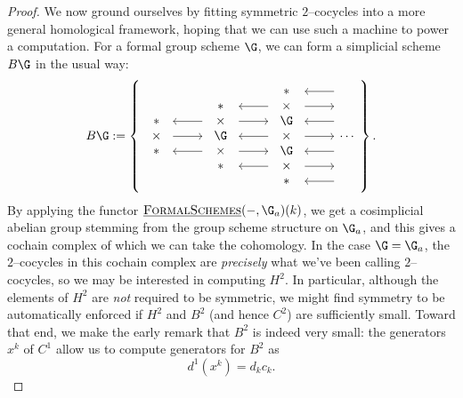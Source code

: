 \begin{proof}
We now ground ourselves by fitting symmetric \(2\)--cocycles into a more general homological framework, hoping that we can use such a machine to power a computation.  For a formal group scheme \(\G\), we can form a simplicial scheme \(B\G\) in the usual way:
\[B\G := \left\{
\begin{tikzcd}[ampersand replacement=\&]
\begin{array}{c} * \\ \times \\ * \end{array} \arrow{r} \arrow[leftarrow,shift left=\baselineskip]{r} \arrow[leftarrow,shift right=\baselineskip]{r} \&
\begin{array}{c} * \\ \times \\ \G \\ \times \\ * \end{array} \arrow[leftarrow, shift left=(2*\baselineskip)]{r} \arrow[shift left=\baselineskip]{r} \arrow[leftarrow]{r} \arrow[shift right=\baselineskip]{r} \arrow[leftarrow, shift right=(2*\baselineskip)]{r} \&
\begin{array}{c} * \\ \times \\ \G \\ \times \\ \G \\ \times \\ *\end{array} \arrow[leftarrow, shift left=(3*\baselineskip)]{r} \arrow[shift left=(2*\baselineskip)]{r} \arrow[leftarrow, shift left=\baselineskip]{r} \arrow{r} \arrow[leftarrow, shift right=\baselineskip]{r} \arrow[shift right=(2*\baselineskip)]{r} \arrow[leftarrow, shift right=(3*\baselineskip)]{r} \&
\cdots
\end{tikzcd}
\right\}.\]
By applying the functor \(\InternalHom{FormalSchemes}(-, \G_a)(k)\), we get a cosimplicial abelian group stemming from the group scheme structure on \(\G_a\), and this gives a cochain complex of which we can take the cohomology.  In the case \(\G = \G_a\), the \(2\)--cocycles in this cochain complex are \emph{precisely} what we've been calling \(2\)--cocycles, so we may be interested in computing \(H^2\).  In particular, although the elements of \(H^2\) are \emph{not} required to be symmetric, we might find symmetry to be automatically enforced if \(H^2\) and \(B^2\) (and hence \(C^2\)) are sufficiently small.  Toward that end, we make the early remark that \(B^2\) is indeed very small: the generators \(x^k\) of \(C^1\) allow us to compute generators for \(B^2\) as \[d^1(x^k) = d_k c_k.\]


\end{proof}
